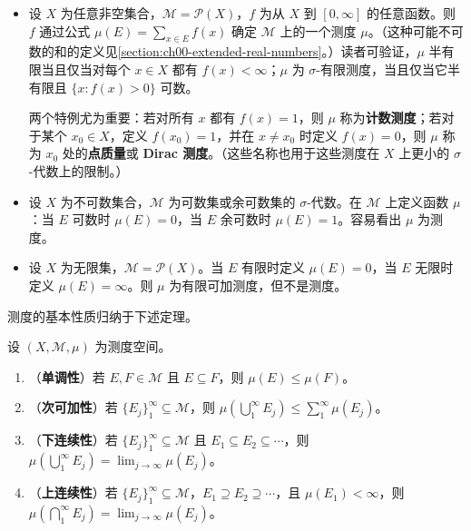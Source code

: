\documentclass[../../main.tex]{subfiles}%
\begin{document}
\begin{examples}\label{examples:ch01-measure-examples}
\begin{itemize}
\item 设 $X$ 为任意非空集合，$\mathscr{M}=\mathscr{P}(X)$，$f$ 为从 $X$ 到 $[0,\infty]$ 的任意函数。则 $f$ 通过公式 $\mu(E)=\sum_{x\in E}f(x)$ 确定 $\mathscr{M}$ 上的一个测度 $\mu$。（这种可能不可数的和的定义见\cref{section:ch00-extended-real-numbers}。）读者可验证，$\mu$ 半有限当且仅当对每个 $x\in X$ 都有 $f(x)<\infty$；$\mu$ 为 $\sigma$-有限测度，当且仅当它半有限且 $\{x:f(x)>0\}$ 可数。
\begin{definition*}
两个特例尤为重要：若对所有 $x$ 都有 $f(x)=1$，则 $\mu$ 称为\textbf{计数测度}；若对于某个 $x_0\in X$，定义 $f(x_0)=1$，并在 $x\ne x_0$ 时定义 $f(x)=0$，则 $\mu$ 称为 $x_0$ 处的\textbf{点质量}或 \textbf{Dirac 测度}。（这些名称也用于这些测度在 $X$ 上更小的 $\sigma$-代数上的限制。）
\end{definition*}

\item 设 $X$ 为不可数集合，$\mathscr{M}$ 为可数集或余可数集的 $\sigma$-代数。在 $\mathscr{M}$ 上定义函数 $\mu$：当 $E$ 可数时 $\mu(E)=0$，当 $E$ 余可数时 $\mu(E)=1$。容易看出 $\mu$ 为测度。
\item 设 $X$ 为无限集，$\mathscr{M}=\mathscr{P}(X)$。当 $E$ 有限时定义 $\mu(E)=0$，当 $E$ 无限时定义 $\mu(E)=\infty$。则 $\mu$ 为有限可加测度，但不是测度。
\end{itemize}
\end{examples}


测度的基本性质归纳于下述定理。

\begin{theorem}\label{theorem:ch01-measure-properties}
设 $(X,\mathscr{M},\mu)$ 为测度空间。
\begin{enumerate}[label=\alph*.,ref=(\alph*)]
\item\label{item:ch01-measure-monotonicity} （\textbf{单调性}）若 $E,F\in\mathscr{M}$ 且 $E\subseteq F$，则 $\mu(E)\leqslant\mu(F)$。
\item\label{item:ch01-measure-subadditivity} （\textbf{次可加性}）若 $\{E_j\}_1^\infty\subseteq\mathscr{M}$，则 $\mu(\bigcup_1^\infty E_j)\leqslant\sum_1^\infty\mu(E_j)$。
\item\label{item:ch01-measure-continuity-below} （\textbf{下连续性}）若 $\{E_j\}_1^\infty\subseteq\mathscr{M}$ 且 $E_1\subseteq E_2\subseteq\cdots$，则 $\mu(\bigcup_1^\infty E_j)=\lim_{j\to\infty}\mu(E_j)$。
\item\label{item:ch01-measure-continuity-above} （\textbf{上连续性}）若 $\{E_j\}_1^\infty\subseteq\mathscr{M}$，$E_1\supseteq E_2\supseteq\cdots$，且 $\mu(E_1)<\infty$，则 $\mu(\bigcap_1^\infty E_j)=\lim_{j\to\infty}\mu(E_j)$。
\end{enumerate}
\end{theorem}
\end{document}
